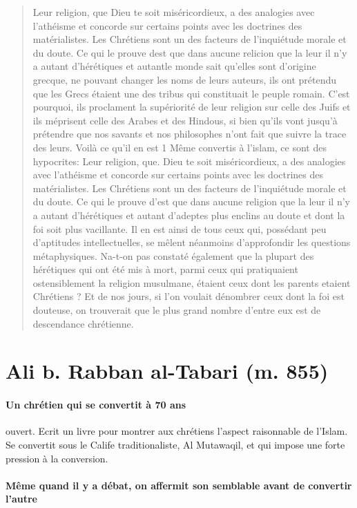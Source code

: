 \begin{quote}
Leur religion, que Dieu te soit miséricordieux, a des analogies avec l'athéisme et concorde sur certains points avec les doctrines des matérialistes. Les Chrétiens sont un des facteurs de l'inquiétude morale et du doute. Ce qui le prouve dest que dans aucune relicion que la leur il n'y a autant d'hérétiques et autantle monde sait qu'elles sont d'origine grecque, ne pouvant changer les noms de leurs auteurs, ils ont prétendu que les Grecs étaient une des tribus qui constituait le peuple romain.
C'est pourquoi, ils proclament la supériorité de leur religion sur celle des Juifs et ils méprisent celle des Arabes et des Hindous, si bien qu'ils vont jusqu'à prétendre que nos savants et nos philosophes n'ont fait que suivre la trace des leurs. Voilà ce qu'il en est 1 Même convertis à l'islam, ce sont des hypocrites:
Leur religion, que. Dieu te soit miséricordieux, a des analogies avec l'athéisme et concorde sur certains points avec les doctrines des matérialistes. Les Chrétiens sont un des facteurs de l'inquiétude morale et du doute. Ce qui le prouve d'est que dans aucune religion que la leur il n'y a autant d'hérétiques et autant d'adeptes plus enclins au doute et dont la foi soit plus vacillante. Il en est ainsi de tous ceux qui, possédant peu d'aptitudes intellectuelles, se mêlent néanmoins d'approfondir les questions métaphysiques. Na-t-on pas constaté également que la plupart des hérétiques qui ont été mis à mort, parmi ceux qui pratiquaient ostensiblement la religion musulmane, étaient ceux dont les parents etaient Chrétiens ? Et de nos jours, si l'on voulait dénombrer ceux dont la foi est douteuse, on trouverait que le plus grand nombre d'entre eux est de descendance chrétienne.
\end{quote}

\section{Ali b. Rabban al-Tabari (m. 855)} 

\paragraph{Un chrétien qui se convertit à 70 ans} ouvert. Ecrit un livre pour montrer aux chrétiens l'aspect raisonnable de l'Islam. Se convertit sous le Calife traditionaliste, Al Mutawaqil, et qui impose une forte pression à la conversion.


\paragraph{Même quand il y a débat, on affermit son semblable avant de convertir l'autre} 

